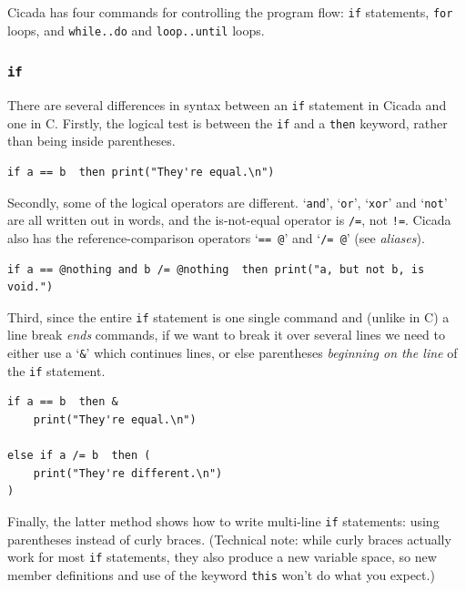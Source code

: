 \documentclass{article}
\newenvironment{code}{
       \begin{list}{}{
               \setlength{\leftmargin}{.4in}
               \setlength{\rightmargin}{0in}
               \setlength{\topsep}{.2in}
       }
       \small
       \item[] }
       { \end{list}   }
\begin{document}
Cicada has four commands for controlling the program flow:  \verb#if# statements, \verb#for# loops, and \verb#while..do# and \verb#loop..until# loops.


\subsubsection{\texttt{if}} 

There are several differences in syntax between an \texttt{if} statement in Cicada and one in C.  Firstly, the logical test is between the \verb#if# and a \verb#then# keyword, rather than being inside parentheses.

\begin{code} \begin{verbatim}
if a == b  then print("They're equal.\n")
\end{verbatim} \end{code}

\noindent Secondly, some of the logical operators are different.  `\verb#and#', `\verb#or#', `\verb#xor#' and `\verb#not#' are all written out in words, and the is-not-equal operator is \verb#/=#, not \verb#!=#.  Cicada also has the reference-comparison operators `\verb#== @#' and `\verb#/= @#' (see \emph{aliases}).

\begin{code} \begin{verbatim}
if a == @nothing and b /= @nothing  then print("a, but not b, is void.")
\end{verbatim} \end{code}

\noindent Third, since the entire \verb#if# statement is one single command and (unlike in C) a line break \emph{ends} commands, if we want to break it over several lines we need to either use a `\verb#&#' which continues lines, or else parentheses \emph{beginning on the line} of the \verb#if# statement.

\begin{code} \begin{verbatim}
if a == b  then &
    print("They're equal.\n")

else if a /= b  then (
    print("They're different.\n")
)
\end{verbatim} \end{code}

\noindent Finally, the latter method shows how to write multi-line \verb#if# statements:  using parentheses instead of curly braces.  (Technical note:  while curly braces actually work for most \verb#if# statements, they also produce a new variable space, so new member definitions and use of the keyword \verb#this# won't do what you expect.)
\end{document}
